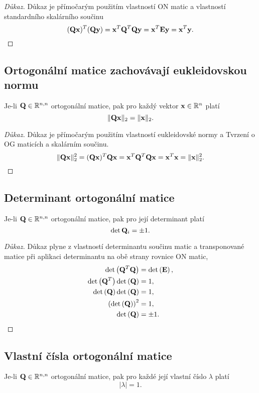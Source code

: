 \begin{proof}[Důkaz]
	Důkaz je přímočarým použitím vlastností ON matic a vlastností standardního skalárního součinu
	\[ (\mathbf{Q}\mathbf{x})^T(\mathbf{Q}\mathbf{y}) = \mathbf{x}^T \mathbf{Q}^T \mathbf{Q} \mathbf{y} = \mathbf{x}^T \mathbf{E} \mathbf{y} = \mathbf{x}^T \mathbf{y}. \]
\end{proof}

\subsection*{Ortogonální matice zachovávají eukleidovskou normu}

Je-li $\mathbf{Q} \in \mathbb{R}^{n,n}$ ortogonální matice, pak pro každý vektor $\mathbf{x} \in \mathbb{R}^n$ platí
\[ \| \mathbf{Q}\mathbf{x}\|_2 = \|\mathbf{x}\|_2. \]

\begin{proof}[Důkaz]
	Důkaz je přímočarým použitím vlastností eukleidovské normy a Tvrzení o OG maticích a skalárním součinu.
	\[ \| \mathbf{Q}\mathbf{x}\|_2^2 = (\mathbf{Q}\mathbf{x})^T\mathbf{Q}\mathbf{x} = \mathbf{x}^T\mathbf{Q}^T\mathbf{Q}\mathbf{x} = \mathbf{x}^T\mathbf{x} = \| \mathbf{x} \|_2^2. \]
\end{proof}

\subsection*{Determinant ortogonální matice}

Je-li $\mathbf{Q} \in \mathbb{R}^{n,n}$ ortogonální matice, pak pro její determinant platí
\[ \det \mathbf{Q}_i = \pm 1. \]

\begin{proof}[Důkaz]
	Důkaz plyne z vlastností determinantu součinu matic a transponované matice při aplikaci determinantu na obě strany rovnice ON matic,
	\begin{align*}
		\det \left( \mathbf{Q}^T \mathbf{Q} \right) &= \det \left(\mathbf{E} \right),\\
		\det \left( \mathbf{Q}^T \right) \det \left( \mathbf{Q} \right) &= 1,\\
		\det \left(\mathbf{Q} \right) \det \left(\mathbf{Q} \right) &= 1,\\
		\left(\det \left(\mathbf{Q} \right) \right)^2 &= 1,\\
		\det \left(\mathbf{Q} \right) &= \pm 1.
	\end{align*}
\end{proof}

\subsection*{Vlastní čísla ortogonální matice}

Je-li $\mathbf{Q} \in \mathbb{R}^{n,n}$ ortogonální matice, pak pro každé její vlastní číslo $\lambda$ platí
\[ |\lambda| = 1. \]

